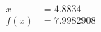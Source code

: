 \documentclass[preview]{standalone}
\begin{document}
\begin{align*}
x &= 4.8834\\f(x) &= 7.9982908
\end{align*}
\end{document}
